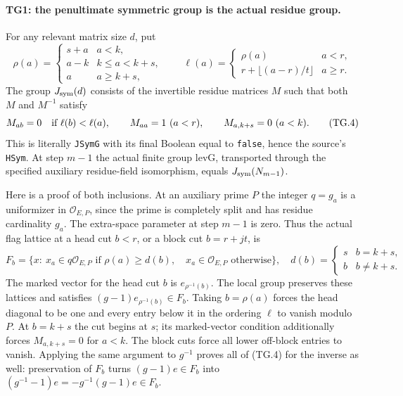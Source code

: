 \paragraph{TG1: the penultimate symmetric group is the actual residue group.}
For any relevant matrix size $d$, put
\[
 \rho(a)=
 \begin{cases}s+a&a<k,\\a-k&k\le a<k+s,\\a&a\ge k+s,
 \end{cases}
 \qquad
 \ell(a)=
 \begin{cases}\rho(a)&a<r,\\r+\lfloor(a-r)/t\rfloor&a\ge r.
 \end{cases}
 \tag{TG.3}
\]
The group $J_{\rm sym}(d)$ consists of the invertible residue
matrices $M$ such that both $M$ and $M^{-1}$ satisfy
\[
 M_{ab}=0\quad\hbox{if }\ell(b)<\ell(a),\qquad
 M_{aa}=1\ (a<r),\qquad M_{a,k+s}=0\ (a<k).
 \tag{TG.4}
\]
This is literally \texttt{JSymG} with its final Boolean equal to
\texttt{false}, hence the source's \texttt{HSym}. At step $m-1$
the actual finite group $\mathrm{levG}$, transported through the
specified auxiliary residue-field isomorphism, equals
$J_{\rm sym}(N_{m-1})$.

Here is a proof of both inclusions. At an auxiliary prime $P$ the
integer $q=g_a$ is a uniformizer in $\mathcal O_{E,P}$, since the
prime is completely split and has residue cardinality $g_a$.
The extra-space parameter at step $m-1$ is zero. Thus the actual
flag lattice at a head cut $b<r$, or a block cut $b=r+jt$, is
\[
 F_b=\{x:\ x_a\in q\mathcal O_{E,P}
                \text{ if }\rho(a)\ge d(b),\quad
                x_a\in\mathcal O_{E,P}\text{ otherwise}\},
 \quad d(b)=\begin{cases}s&b=k+s,\\b&b\ne k+s.\end{cases}
 \tag{TG.5}
\]
The marked vector for the head cut $b$ is $e_{\rho^{-1}(b)}$.
The local group preserves these lattices and satisfies
$(g-1)e_{\rho^{-1}(b)}\in F_b$. Taking $b=\rho(a)$ forces the
head diagonal to be one and every entry below it in the ordering
$\ell$ to vanish modulo $P$. At $b=k+s$ the cut begins at $s$;
its marked-vector condition additionally forces
$M_{a,k+s}=0$ for $a<k$. The block cuts force all lower off-block
entries to vanish. Applying the same argument to $g^{-1}$ proves
all of (TG.4) for the inverse as well: preservation of $F_b$ turns
$(g-1)e\in F_b$ into $(g^{-1}-1)e=-g^{-1}(g-1)e\in F_b$.

